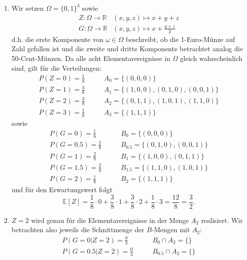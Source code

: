 \documentclass[a4paper]{article}
\begin{document}
\begin{enumerate}
    \item Wir setzen $\Omega = \{0,1\}^3 $ sowie 
    \begin{align}
        Z: \Omega \to \mathds{R} & (x,y,z) \mapsto x + y + z\\
        G: \Omega \to \mathds{R} & (x,y,z) \mapsto x + \frac{y+z}{2}
    \end{align}
    d.h. die erste Komponente von $\omega \in \Omega$ beschreibt, ob die 1-Euro-Münze auf Zahl gefallen ist und die zweite und dritte Komponente betrachtet analog die 50-Cent-Münzen. Da alle acht Elementarereignisse in $\Omega$ gleich wahrscheinlich sind, gilt für die Verteilungen:
    \begin{align*}
        P(Z = 0) = \frac{1}{8} & \qquad A_0 = \{(0,0,0)\} \\ 
        P(Z = 1) = \frac{3}{8} & \qquad A_1 = \{(1,0,0), (0,1,0), (0,0,1) \}\\
        P(Z = 2) = \frac{3}{8} & \qquad A_2 = \{(0,1,1), (1,0,1), (1,1,0) \}\\
        P(Z = 3) = \frac{1}{8} & \qquad A_3 = \{(1,1,1)\}
    \end{align*}
    sowie
    \begin{align*}
        P(G = 0) = \frac{1}{8} & \qquad B_0 = \{(0,0,0)\} \\ 
        P(G = 0.5) = \frac{2}{8} & \qquad B_{0.5} = \{(0,1,0), (0,0,1) \}\\
        P(G = 1) = \frac{2}{8} & \qquad B_{1} = \{(1,0,0), (0,1,1)\}\\
        P(G = 1.5) = \frac{2}{8} & \qquad B_{1.5} = \{(1,1,0), (1,0,1)\}\\
        P(G = 2) = \frac{1}{8} & \qquad B_2 = \{(1,1,1)\}
    \end{align*}
    und für den Erwartungswert folgt
    \begin{equation*}
        \mathds{E}[Z] = \frac{1}{8} \cdot 0 + \frac{3}{8} \cdot 1 + \frac{3}{8} \cdot 2 + \frac{1}{8} \cdot 3 = \frac{12}{8} = \frac{3}{2} \text{.}
    \end{equation*}
    \item $Z = 2$ wird genau für die Elementarereignisse in der Menge $A_2$ realisiert. Wir betrachten also jeweils die Schnittmenge der $B$-Mengen mit $A_2$:
    \begin{align*}
        P(G = 0 | Z = 2) = \frac{0}{3} & \qquad B_0 \cap A_2= \{\} \\ 
        P(G = 0.5 | Z = 2) = \frac{0}{3} & \qquad B_{0.5} \cap A_2= \{\}\\

\end{align*}
\end{enumerate}
\end{document}
